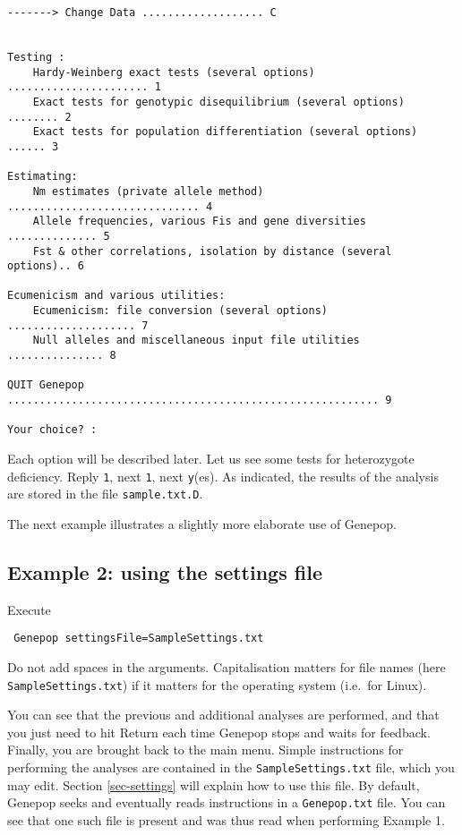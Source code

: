 \documentclass[
  12pt,
]{book}
\begin{document}
\begin{verbatim}
-------> Change Data ................... C


Testing :
    Hardy-Weinberg exact tests (several options) ...................... 1
    Exact tests for genotypic disequilibrium (several options) ........ 2
    Exact tests for population differentiation (several options) ...... 3

Estimating:
    Nm estimates (private allele method) .............................. 4
    Allele frequencies, various Fis and gene diversities .............. 5
    Fst & other correlations, isolation by distance (several options).. 6

Ecumenicism and various utilities:
    Ecumenicism: file conversion (several options) .................... 7
    Null alleles and miscellaneous input file utilities ............... 8

QUIT Genepop .......................................................... 9

Your choice? :
\end{verbatim}

Each option will be described later. Let us see some tests for heterozygote deficiency. Reply \texttt{1}, next \texttt{1}, next \texttt{y}(es). As indicated, the results of the analysis are stored in the file \texttt{sample.txt.D}.

The next example illustrates a slightly more elaborate use of Genepop.

\hypertarget{example-2-using-the-settings-file}{%
\subsection{Example 2: using the settings file}\label{example-2-using-the-settings-file}}

Execute

\begin{verbatim}
 Genepop settingsFile=SampleSettings.txt
\end{verbatim}

Do not add spaces in the arguments. Capitalisation matters for file names (here \texttt{SampleSettings.txt}) if it matters for the operating system (i.e.~for Linux).

You can see that the previous and additional analyses are performed, and that you just need to hit Return each time Genepop stops and waits for feedback. Finally, you are brought back to the main menu. Simple instructions for performing the analyses are contained in the \texttt{SampleSettings.txt} file, which you may edit. Section \ref{sec-settings} will explain how to use this file. By default, Genepop seeks and eventually reads instructions in a \texttt{Genepop.txt} file. You can see that one such file is present and was thus read when performing Example 1.
\end{document}
